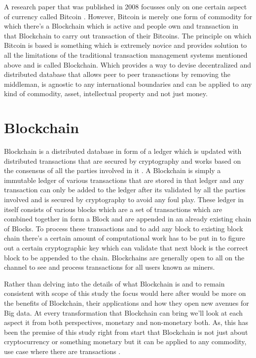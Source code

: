 A research paper that was published in 2008 focusses only on one certain aspect of currency called Bitcoin \cite{bitcoin12}. However, Bitcoin is merely one form of commodity for which there's a Blockchain which is active and people own and transaction in that Blockchain to carry out transaction of their Bitcoins. The principle on which Bitcoin is based is something which is extremely novice and provides solution to all the limitations of the traditional transaction management systems mentioned above and is called Blockchain. Which provides a way to devise decentralized and distributed database that allows peer to peer transactions by removing the middleman, is agnostic to any international boundaries and can be applied to any kind of commodity, asset, intellectual property and not just money.


\section{Blockchain}
Blockchain is a distributed database in form of a ledger which is updated with distributed transactions that are secured by cryptography and works based on the consensus of all the parties involved in it \cite{beck13}. A Blockchain is simply a immutable ledger of various transactions that are stored in that ledger and any transaction can only be added to the ledger after its validated by all the parties involved and is secured by cryptography to avoid any foul play. These ledger in itself consists of various blocks which are a set of transactions which are combined together in form a Block and are appended in an already existing chain of Blocks. To process these transactions and to add any block to existing block chain there's a certain amount of computational work has to be put in to figure out a certain cryptographic key which can validate that next block is the correct block to be appended to the chain. Blockchains are generally open to all on the channel to see and process transactions for all users known as miners.

Rather than delving into the details of what Blockchain is and to remain consistent with scope of this study the focus would here after would be more on the benefits of Blockchain, their applications and how they open new avenues for Big data. At every transformation that Blockchain can bring we'll look at each aspect it from both perspectives, monetary and non-monetary both. As, this has been the premise of this study right from start that Blockchain is not just about cryptocurrency or something monetary but it can be applied to any commodity, use case where there are transactions \cite{beck13}.


